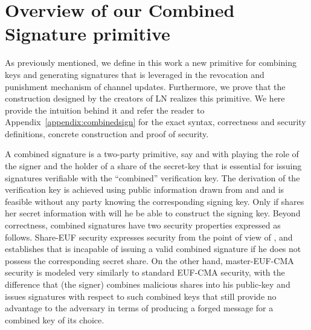 \section{Overview of our Combined Signature primitive}  
  As previously mentioned, we define in this work a new primitive for combining
  keys and generating signatures that is leveraged in the revocation and
  punishment mechanism of channel updates. Furthermore, we prove that the
  construction designed by the creators of LN realizes this primitive. We here
  provide the intuition behind it and refer the reader to
  Appendix~\ref{appendix:combinedsign} for the exact syntax, correctness and
  security definitions, concrete construction and proof of security.

  A combined signature is a two-party primitive, say \alice{} and \bob{} with \bob{} playing the role of the signer and \alice{} the holder of a share of the secret-key that is essential for issuing signatures verifiable with the ``combined'' verification key. The  derivation of the verification key
is achieved  using public information drawn from  \alice{} and \bob and is feasible without any party knowing the
  corresponding signing key. Only if \alice{} shares her secret information with
  \bob{} will he be able to construct the signing key. 
  Beyond correctness, combined signatures have two security properties expressed as follows. Share-EUF security expresses security from the point of view of \alice{}, and establishes that \bob{} is incapable of issuing a valid combined signature if he does not possess the corresponding secret share. On the other hand, master-EUF-CMA security is modeled very similarly to standard EUF-CMA security, with the difference that \bob{} (the signer) combines malicious shares into his public-key and issues signatures with respect to such combined keys that still provide no advantage to the adversary in terms of producing a forged message for a combined key of its choice. 

